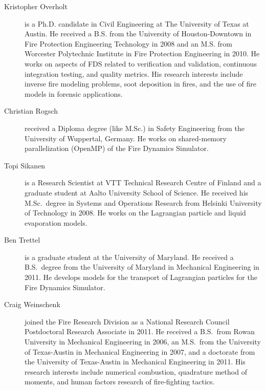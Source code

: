 \begin{description}
\item[Kristopher Overholt] is a Ph.D. candidate in Civil Engineering at The University of Texas at Austin. He received a B.S. from the University of Houston-Downtown in Fire Protection Engineering Technology in 2008 and an M.S. from Worcester Polytechnic Institute in Fire Protection Engineering in 2010. He works on aspects of FDS related to verification and validation, continuous integration testing, and quality metrics. His research interests include inverse fire modeling problems, soot deposition in fires, and the use of fire models in forensic applications.

\item[Christian Rogsch] received a Diploma degree (like M.Sc.) in Safety Engineering from the University of Wuppertal, Germany. He works on shared-memory parallelization (OpenMP) of the Fire Dynamics Simulator.

\item[Topi Sikanen] is a Research Scientist at VTT Technical Research Centre of Finland and a graduate student at Aalto University School of Science. He received his M.Sc.~degree in Systems and Operations Research from Helsinki University of Technology in 2008. He works on the Lagrangian particle and liquid evaporation models. 

\item[Ben Trettel] is a graduate student at the University of Maryland. He received a B.S.~degree from the University of Maryland in Mechanical Engineering in 2011. He develops models for the transport of Lagrangian particles for the Fire Dynamics Simulator.

\item[Craig Weinschenk] joined the Fire Research Division as a National Research Council Postdoctoral Research Associate in 2011. He received a B.S.~from Rowan University in Mechanical Engineering in 2006, an M.S.~from the University of Texas-Austin in Mechanical Engineering in 2007, and a doctorate from the University of Texas-Austin in Mechanical Engineering in 2011. His research interests include numerical combustion, quadrature method of moments, and human factors research of fire-fighting tactics.

\end{description}



